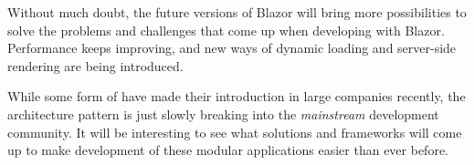 Without much doubt, the future versions of Blazor will bring more possibilities
to solve the problems and challenges that come up when developing
 with Blazor. Performance keeps improving, and new ways
of dynamic loading and server-side rendering are being introduced. 

While some form of  have made their introduction in
large companies recently, the architecture pattern is just slowly breaking into
the \textit{mainstream} development community. It will be interesting to see
what solutions and frameworks will come up to make development of these modular
applications easier than ever before.
